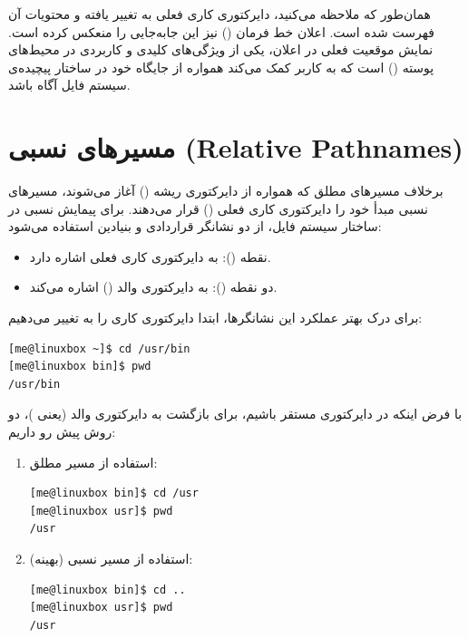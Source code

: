 همان‌طور که ملاحظه می‌کنید، دایرکتوری کاری فعلی به  تغییر یافته و محتویات آن فهرست شده است. اعلان خط فرمان () نیز این جابه‌جایی را منعکس کرده است. نمایش موقعیت فعلی در اعلان، یکی از ویژگی‌های کلیدی و کاربردی در محیط‌های پوسته () است که به کاربر کمک می‌کند همواره از جایگاه خود در ساختار پیچیده‌ی سیستم فایل آگاه باشد.

\section{مسیرهای نسبی (Relative Pathnames)}

برخلاف مسیرهای مطلق که همواره از دایرکتوری ریشه () آغاز می‌شوند، مسیرهای نسبی مبدأ خود را دایرکتوری کاری فعلی () قرار می‌دهند. برای پیمایش نسبی در ساختار سیستم فایل، از دو نشانگر قراردادی و بنیادین استفاده می‌شود:

\begin{itemize}
  \item نقطه (): به دایرکتوری کاری فعلی اشاره دارد.
  \item دو نقطه (): به دایرکتوری والد () اشاره می‌کند.
\end{itemize}

برای درک بهتر عملکرد این نشانگرها، ابتدا دایرکتوری کاری را به  تغییر می‌دهیم:

\begin{latin}
\begin{lstlisting}
[me@linuxbox ~]$ cd /usr/bin
[me@linuxbox bin]$ pwd
/usr/bin
\end{lstlisting}
\end{latin}

با فرض اینکه در دایرکتوری  مستقر باشیم، برای بازگشت به دایرکتوری والد (یعنی )، دو روش پیش رو داریم:

\begin{enumerate}
  \item استفاده از مسیر مطلق:
\begin{latin}
\begin{lstlisting}
[me@linuxbox bin]$ cd /usr
[me@linuxbox usr]$ pwd
/usr
\end{lstlisting}
\end{latin}

  \item استفاده از مسیر نسبی (بهینه):
\begin{latin}
\begin{lstlisting}
[me@linuxbox bin]$ cd ..
[me@linuxbox usr]$ pwd
/usr
\end{lstlisting}
\end{latin}
\end{enumerate}

